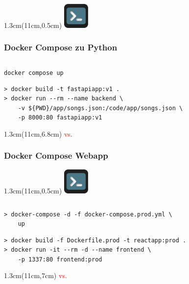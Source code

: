 \documentclass[22pt]{beamer}
\newcommand{\terminal}{
    \begin{textblock*}{1.3cm}(11cm,0.5cm) %
    \includegraphics[width=1.3cm]{Bilder/terminal2.png}
    \end{textblock*}
}
\begin{document}
\begin{frame}[fragile]
    \terminal
    \frametitle{Docker Compose zu Python}
    \inputminted[fontsize=\footnotesize, frame=lines]{dockerfile}{../examples/FastAPI/docker-compose.yml}
    \verb|docker compose up|
    \medskip\pause
    \begin{verbatim}
> docker build -t fastapiapp:v1 .
> docker run --rm --name backend \
    -v ${PWD}/app/songs.json:/code/app/songs.json \
    -p 8000:80 fastapiapp:v1
    \end{verbatim}
    \begin{textblock*}{1.3cm}(11cm,6.8cm) %
        \huge \textcolor{red}{vs.}
    \end{textblock*}
\end{frame}

\begin{frame}[fragile]
    \frametitle{Docker Compose Webapp}
    \terminal
    \inputminted[fontsize=\footnotesize, frame=lines]{dockerfile}{../examples/React/docker-compose.prod.yml}
\begin{verbatim}
> docker-compose -d -f docker-compose.prod.yml \
    up
\end{verbatim}
\medskip

\begin{verbatim}
> docker build -f Dockerfile.prod -t reactapp:prod .
> docker run -it --rm -d --name frontend \
    -p 1337:80 frontend:prod
\end{verbatim}
\only<1>{
    \begin{textblock*}{6cm}(1cm,1.5cm) %
        \begin{tcolorbox}[width=6cm, height=4.2cm, colback=white, colframe=white, sharp corners]
        \centering
        \end{tcolorbox}
    \end{textblock*}
}
\only<2>{}
\begin{textblock*}{1.3cm}(11cm,7cm) %
    \huge \textcolor{red}{vs.}
\end{textblock*}
\end{frame}
\end{document}
